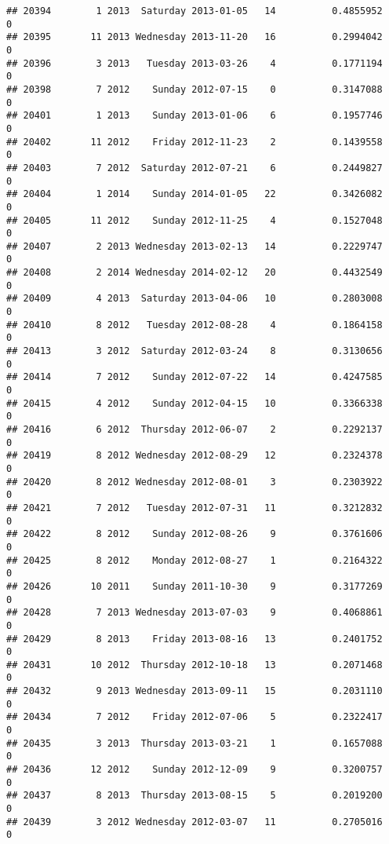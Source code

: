 \documentclass[
]{article}
\begin{document}
\begin{verbatim}
## 20394        1 2013  Saturday 2013-01-05   14          0.4855952             0
## 20395       11 2013 Wednesday 2013-11-20   16          0.2994042             0
## 20396        3 2013   Tuesday 2013-03-26    4          0.1771194             0
## 20398        7 2012    Sunday 2012-07-15    0          0.3147088             0
## 20401        1 2013    Sunday 2013-01-06    6          0.1957746             0
## 20402       11 2012    Friday 2012-11-23    2          0.1439558             0
## 20403        7 2012  Saturday 2012-07-21    6          0.2449827             0
## 20404        1 2014    Sunday 2014-01-05   22          0.3426082             0
## 20405       11 2012    Sunday 2012-11-25    4          0.1527048             0
## 20407        2 2013 Wednesday 2013-02-13   14          0.2229747             0
## 20408        2 2014 Wednesday 2014-02-12   20          0.4432549             0
## 20409        4 2013  Saturday 2013-04-06   10          0.2803008             0
## 20410        8 2012   Tuesday 2012-08-28    4          0.1864158             0
## 20413        3 2012  Saturday 2012-03-24    8          0.3130656             0
## 20414        7 2012    Sunday 2012-07-22   14          0.4247585             0
## 20415        4 2012    Sunday 2012-04-15   10          0.3366338             0
## 20416        6 2012  Thursday 2012-06-07    2          0.2292137             0
## 20419        8 2012 Wednesday 2012-08-29   12          0.2324378             0
## 20420        8 2012 Wednesday 2012-08-01    3          0.2303922             0
## 20421        7 2012   Tuesday 2012-07-31   11          0.3212832             0
## 20422        8 2012    Sunday 2012-08-26    9          0.3761606             0
## 20425        8 2012    Monday 2012-08-27    1          0.2164322             0
## 20426       10 2011    Sunday 2011-10-30    9          0.3177269             0
## 20428        7 2013 Wednesday 2013-07-03    9          0.4068861             0
## 20429        8 2013    Friday 2013-08-16   13          0.2401752             0
## 20431       10 2012  Thursday 2012-10-18   13          0.2071468             0
## 20432        9 2013 Wednesday 2013-09-11   15          0.2031110             0
## 20434        7 2012    Friday 2012-07-06    5          0.2322417             0
## 20435        3 2013  Thursday 2013-03-21    1          0.1657088             0
## 20436       12 2012    Sunday 2012-12-09    9          0.3200757             0
## 20437        8 2013  Thursday 2013-08-15    5          0.2019200             0
## 20439        3 2012 Wednesday 2012-03-07   11          0.2705016             0

\end{verbatim}
\end{document}
